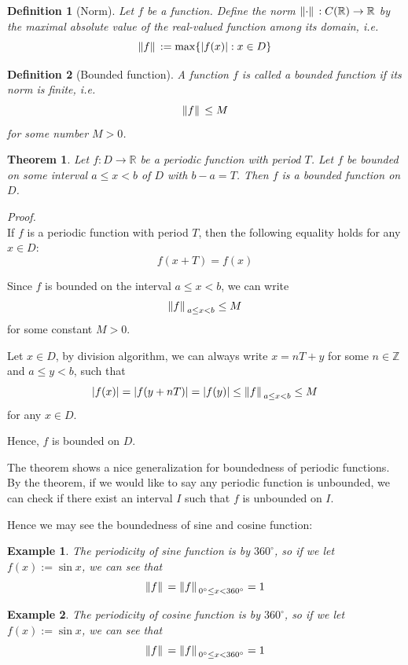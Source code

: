 \documentclass[12pt]{article}
\newtheorem{definition}{Definition}[section]
\newtheorem*{theorem}{Theorem}
\newtheorem*{example}{Example}
\renewenvironment{proof}[1][Proof]{\begin{snugshade*} \textit{{#1}.}\\}{\hfill \qedsymbol \end{snugshade*}}
\begin{document}
    \begin{definition}[Norm]
        Let $f$ be a function. Define the norm $\norm*{\cdot}:C(\mathbb{R})\to\mathbb{R}$ by the maximal absolute value of the real-valued function among its domain, i.e. \[\norm*{f}:=\max\{|f(x)|:x\in D\}\] 
    \end{definition}

    \begin{definition}[Bounded function]
        A function $f$ is called a bounded function if its norm is finite, i.e. \[\norm*{f}\leq M\] for some number $M>0$.
    \end{definition}

    \begin{theorem}
        Let $f:D\to\mathbb{R}$ be a periodic function with period $T$. Let $f$ be bounded on some interval $a\leq x < b$ of $D$ with $b-a=T$. Then $f$ is a bounded function on $D$.
    \end{theorem}

    \begin{proof}
        If $f$ is a periodic function with period $T$, then the following equality holds for any $x\in D$: \[f(x+T)=f(x)\]

        Since $f$ is bounded on the interval $a\leq x < b$, we can write \[\norm*{f}_{a\leq x< b}\leq M\] for some constant $M>0$.

        Let $x\in D$, by division algorithm, we can always write $x=nT+y$ for some $n\in \mathbb{Z}$ and $a\leq y< b$, such that \[|f(x)|=|f(y+nT)|=|f(y)|\leq \norm*{f}_{a\leq x< b}\leq M\] for any $x\in D$.

        Hence, $f$ is bounded on $D$.
    \end{proof}

    The theorem shows a nice generalization for boundedness of periodic functions. By the theorem, if we would like to say any periodic function is unbounded, we can check if there exist an interval $I$ such that $f$ is unbounded on $I$.

    Hence we may see the boundedness of sine and cosine function:

    \begin{example}
        The periodicity of sine function is by $360^\circ$, so if we let $f(x):=\sin{x}$, we can see that \[\norm*{f}=\norm*{f}_{0^\circ \leq x< 360^\circ}=1\]
    \end{example}

    \begin{example}
        The periodicity of cosine function is by $360^\circ$, so if we let $f(x):=\sin{x}$, we can see that \[\norm*{f}=\norm*{f}_{0^\circ \leq x< 360^\circ}=1\]
    \end{example}
\end{document}
